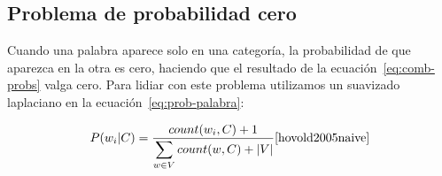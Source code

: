 \subsection{Problema de probabilidad cero}

Cuando una palabra aparece solo en una categoría, la probabilidad de que
aparezca en la otra es cero, haciendo que el resultado de la
ecuación~\ref{eq:comb-probs} valga cero. Para lidiar con este problema
utilizamos un suavizado laplaciano en la ecuación~\ref{eq:prob-palabra}:

\begin{equation}
	\label{eq:prob-palabra-laplace}
	P(w_i|C) = \frac{count(w_i, C) + 1}{\displaystyle\sum_{w \in V}{count(w, C)} + |V|} \cite{hovold2005naive}
\end{equation}
